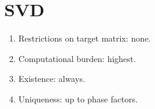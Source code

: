 \section{SVD}

\begin{enumerate}
%
  \item Restrictions on target matrix: none.
%
  \item Computational burden: highest.
%
  \item Existence: always.
%
  \item Uniqueness: up to phase factors.
%
\end{enumerate}


\endinput